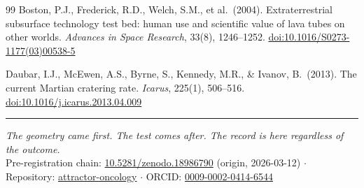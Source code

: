 \documentclass[11pt, a4paper]{article}
\begin{document}
\begin{thebibliography}{99}
Boston, P.J., Frederick, R.D.,
Welch, S.M., et al.\ (2004).
Extraterrestrial subsurface technology
test bed: human use and scientific
value of lava tubes on other worlds.
\textit{Advances in Space Research},
33(8), 1246--1252.
\href{https://doi.org/10.1016/S0273-1177(03)00538-5}
{doi:10.1016/S0273-1177(03)00538-5}

Daubar, I.J., McEwen, A.S., Byrne, S.,
Kennedy, M.R., \& Ivanov, B.\ (2013).
The current Martian cratering rate.
\textit{Icarus}, 225(1), 506--516.
\href{https://doi.org/10.1016/j.icarus.2013.04.009}
{doi:10.1016/j.icarus.2013.04.009}

\end{thebibliography}

\vspace{1em}
\noindent\textcolor{rulecolor}{\rule{\linewidth}{0.4pt}}
\begin{center}
\footnotesize
\textit{The geometry came first.
The test comes after.
The record is here regardless of the outcome.}\\[0.3em]
Pre-registration chain:
\href{https://doi.org/10.5281/zenodo.18986790}
{10.5281/zenodo.18986790} (origin, 2026-03-12)
$\cdot$
Repository:
\href{https://github.com/Eric-Robert-Lawson/attractor-oncology}
{attractor-oncology}
$\cdot$
ORCID:
\href{https://orcid.org/0009-0002-0414-6544}
{0009-0002-0414-6544}
\end{center}
\end{document}
